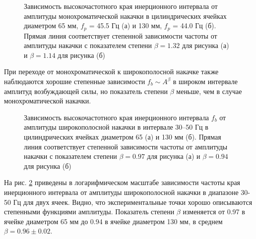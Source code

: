 \begin{figure}[ht]
 \begin{minipage}[ht]{0.49\linewidth}
 \end{minipage}
 \hfill
 \begin{minipage}[ht]{0.49\linewidth}
 \end{minipage}
 \caption{Зависимость высокочастотного края инерционного интервала от амплитуды монохроматической накачки в цилиндрических ячейках диаметром 65 мм, $f_p$ = 45.5 Гц (а) и 130 мм, $f_p$ = 44.0 Гц (б). Прямая линия соответствует степенной зависимости частоты от амплитуды накачки с показателем степени $\beta = 1.32$ для рисунка (а) и $\beta = 1.14$ для рисунка (б)}
 \label{img:water_fb_mono} 
\end{figure}

При переходе от монохроматической к широкополосной накачке также наблюдаются хорошие степенные зависимости $f_b \sim A^\beta$ в широком интервале амплитуд возбуждающей силы, но показатель степени $\beta$ меньше, чем в случае монохроматической накачки.

\begin{figure}[ht]
 \begin{minipage}[ht]{0.49\linewidth}
 \end{minipage}
 \hfill
 \begin{minipage}[ht]{0.49\linewidth}
 \end{minipage}
 \caption{Зависимость высокочастотного края инерционного интервала $f_b$ от амплитуды широкополосной накачки в интервале 30–50 Гц в цилиндрических ячейках диаметром 65 (а) и 130 мм (б). Прямая линия соответствует степенной зависимости частоты от амплитуды накачки с показателем степени $\beta = 0.97$ для рисунка (а) и $\beta = 0.94$ для рисунка (б)}
 \label{img:water_fb_wide} 
\end{figure}

На рис. \ref{img:water_fb_wide} приведены в логарифмическом масштабе зависимости частоты края инерционного интервала от амплитуды широкополосной накачки в диапазоне 30-50 Гц для двух ячеек. Видно, что экспериментальные точки хорошо описываются степенными функциями амплитуды. Показатель степени $\beta$ изменяется от 0.97 в ячейке диаметром 65 мм до 0.94 в ячейке диаметром 130 мм, в среднем $\beta = 0.96 \pm 0.02$.

